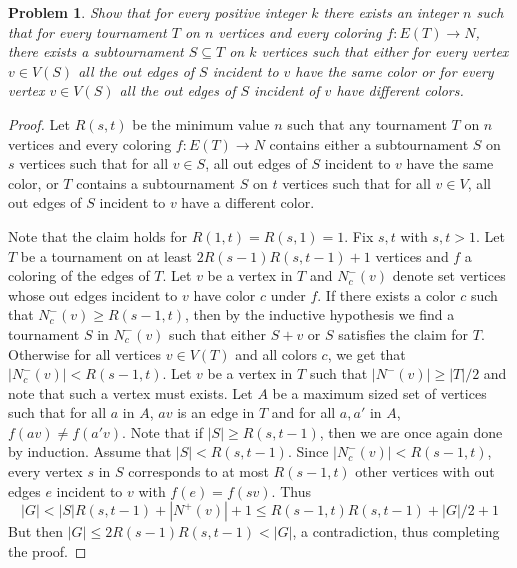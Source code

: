 \documentclass[12pt]{article}
\newtheorem{problem}{Problem}
\begin{document}
\begin{problem} Show that for every positive integer $k$ there exists
  an integer $n$ such that for every tournament $T$ on $n$ vertices
  and every coloring $f: E(T) \to N$, there exists a subtournament
  $S \subseteq T$ on $k$ vertices such that either for every vertex
  $v \in V(S)$ all the out edges of $S$ incident to $v$ have the same
  color or for every vertex $v \in V(S)$ all the out edges of $S$
  incident of $v$ have different colors.
\end{problem}
\begin{proof} Let $R(s,t)$ be the minimum value $n$ such that any
  tournament $T$ on $n$ vertices and every coloring $f:E(T) \to N$
  contains either a subtournament $S$ on $s$ vertices such that for
  all $v \in S$, all out edges of $S$ incident to $v$ have the same
  color, or $T$ contains a subtournament $S$ on $t$ vertices such that
  for all $v \in V$, all out edges of $S$ incident to $v$ have a
  different color.

  Note that the claim holds for $R(1,t) = R(s, 1) = 1$. Fix $s,t$ with
  $s,t > 1$. Let $T$ be a tournament on at least $2R(s-1)R(s,t-1) + 1$
  vertices and $f$ a coloring of the edges of $T$. Let $v$ be a vertex
  in $T$ and $N^{-}_c(v)$ denote set vertices whose out edges incident
  to $v$ have color $c$ under $f$. If there exists a color $c$ such
  that $N^{-}_c(v) \geq R(s - 1, t)$, then by the inductive hypothesis
  we find a tournament $S$ in $N^{-}_c(v)$ such that either $S + v$ or
  $S$ satisfies the claim for $T$. Otherwise for all vertices
  $v \in V(T)$ and all colors $c$, we get that
  $|N^{-}_c(v)| < R(s-1, t)$. Let $v$ be a vertex in $T$ such that
  $|N^{-}(v)| \geq |T|/2$ and note that such a vertex must exists. Let
  $A$ be a maximum sized set of vertices such that for all $a$ in $A$,
  $av$ is an edge in $T$ and for all $a, a'$ in $A$,
  $f(av) \neq f(a'v)$. Note that if $|S| \geq R(s, t-1)$, then we are
  once again done by induction. Assume that $|S| < R(s, t-1)$. Since
  $|N^{-}_c(v)| < R(s-1, t)$, every vertex $s$ in $S$ corresponds to
  at most $ R(s-1, t)$ other vertices with out edges $e$ incident to
  $v$ with $f(e) = f(sv)$. Thus
  \[
    |G| < |S| R(s, t-1) + |N^{+}(v)| + 1 \leq R(s-1, t)R(s, t-1) +
    |G|/2 + 1
  \]
  But then $|G| \leq 2R(s-1)R(s,t-1) < |G|$, a contradiction, thus
  completing the proof.

\end{proof}
\end{document}
